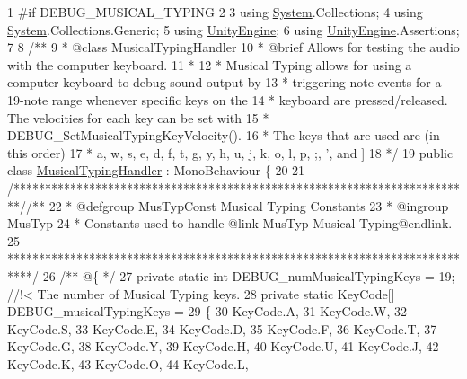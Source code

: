 \begin{DoxyCodeInclude}
1 \textcolor{preprocessor}{#if DEBUG\_MUSICAL\_TYPING}
2 
3 \textcolor{keyword}{using} \hyperlink{namespace_system}{System}.Collections;
4 \textcolor{keyword}{using} \hyperlink{namespace_system}{System}.Collections.Generic;
5 \textcolor{keyword}{using} \hyperlink{namespace_unity_engine}{UnityEngine};
6 \textcolor{keyword}{using} \hyperlink{namespace_unity_engine}{UnityEngine}.Assertions;
7 \textcolor{comment}{}
8 \textcolor{comment}{/** }
9 \textcolor{comment}{ * @class MusicalTypingHandler}
10 \textcolor{comment}{ * @brief Allows for testing the audio with the computer keyboard.}
11 \textcolor{comment}{ * }
12 \textcolor{comment}{ * Musical Typing allows for using a computer keyboard to debug sound output by }
13 \textcolor{comment}{ * triggering note events for a 19-note range whenever specific keys on the }
14 \textcolor{comment}{ * keyboard are pressed/released. The velocities for each key can be set with}
15 \textcolor{comment}{ * DEBUG\_SetMusicalTypingKeyVelocity().}
16 \textcolor{comment}{ * The keys that are used are (in this order)}
17 \textcolor{comment}{ * a, w, s, e, d, f, t, g, y, h, u, j, k, o, l, p, ;, ', and ] }
18 \textcolor{comment}{*/}
19 \textcolor{keyword}{public} \textcolor{keyword}{class }\hyperlink{class_musical_typing_handler}{MusicalTypingHandler} : MonoBehaviour \{
20 
21     \textcolor{comment}{/*************************************************************************/}\textcolor{comment}{/** }
22 \textcolor{comment}{    * @defgroup MusTypConst Musical Typing Constants}
23 \textcolor{comment}{    * @ingroup MusTyp}
24 \textcolor{comment}{    * Constants used to handle @link MusTyp Musical Typing@endlink.}
25 \textcolor{comment}{    ****************************************************************************/}\textcolor{comment}{}
26 \textcolor{comment}{    /** @\{ */}
27     \textcolor{keyword}{private} \textcolor{keyword}{static} \textcolor{keywordtype}{int} DEBUG\_numMusicalTypingKeys = 19; \textcolor{comment}{//!< The number of Musical Typing keys.}
28 \textcolor{comment}{}    \textcolor{keyword}{private} \textcolor{keyword}{static} KeyCode[] DEBUG\_musicalTypingKeys =
29         \{
30             KeyCode.A,
31             KeyCode.W,
32             KeyCode.S,
33             KeyCode.E,
34             KeyCode.D,
35             KeyCode.F,
36             KeyCode.T,
37             KeyCode.G,
38             KeyCode.Y,
39             KeyCode.H,
40             KeyCode.U,
41             KeyCode.J,
42             KeyCode.K,
43             KeyCode.O,
44             KeyCode.L,

\end{DoxyCodeInclude}
